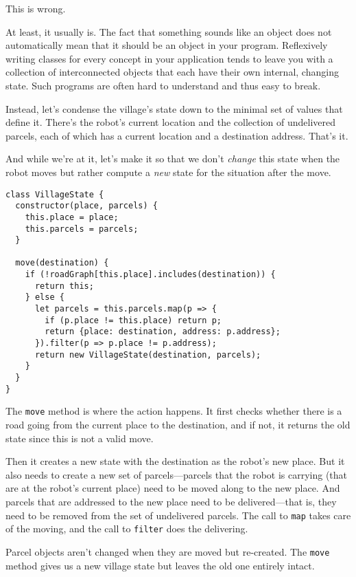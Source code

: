 This is wrong.

At least, it usually is. The fact that something sounds like an object does not automatically mean that it should be an object in your program. Reflexively writing classes for every concept in your application tends to leave you with a collection of interconnected objects that each have their own internal, changing state. Such programs are often hard to understand and thus easy to break.

Instead, let's condense the village's state down to the minimal set of values that define it. There's the robot's current location and the collection of undelivered parcels, each of which has a current location and a destination address. That's it.

And while we're at it, let's make it so that we don't \emph{change} this state when the robot moves but rather compute a \emph{new} state for the situation after the move.

\begin{lstlisting}
class VillageState {
  constructor(place, parcels) {
    this.place = place;
    this.parcels = parcels;
  }

  move(destination) {
    if (!roadGraph[this.place].includes(destination)) {
      return this;
    } else {
      let parcels = this.parcels.map(p => {
        if (p.place != this.place) return p;
        return {place: destination, address: p.address};
      }).filter(p => p.place != p.address);
      return new VillageState(destination, parcels);
    }
  }
}
\end{lstlisting}
\noindent

The \lstinline`move` method is where the action happens. It first checks whether there is a road going from the current place to the destination, and if not, it returns the old state since this is not a valid move.

Then it creates a new state with the destination as the robot's new place. But it also needs to create a new set of parcels—parcels that the robot is carrying (that are at the robot's current place) need to be moved along to the new place. And parcels that are addressed to the new place need to be delivered—that is, they need to be removed from the set of undelivered parcels. The call to \lstinline`map` takes care of the moving, and the call to \lstinline`filter` does the delivering.

Parcel objects aren't changed when they are moved but re-created. The \lstinline`move` method gives us a new village state but leaves the old one entirely intact.

